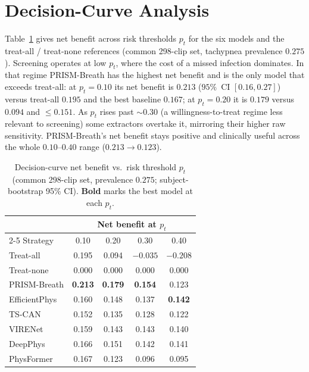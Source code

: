 \section{Decision-Curve Analysis}
\label{app:dca}
Table~\ref{tab:dca} gives net benefit across risk thresholds $p_t$ for the six models and the treat-all /
treat-none references (common 298-clip set, tachypnea prevalence $0.275$). Screening operates at low $p_t$,
where the cost of a missed infection dominates. In that regime PRISM-Breath has the highest net benefit and
is the only model that exceeds treat-all: at $p_t{=}0.10$ its net benefit is $0.213$ ($95\%$~CI
$[0.16,0.27]$) versus treat-all $0.195$ and the best baseline $0.167$; at $p_t{=}0.20$ it is $0.179$ versus
$0.094$ and $\le 0.151$. As $p_t$ rises past $\sim$$0.30$ (a willingness-to-treat regime less relevant to
screening) some extractors overtake it, mirroring their higher raw sensitivity. PRISM-Breath's net benefit
stays positive and clinically useful across the whole $0.10$--$0.40$ range ($0.213 \to 0.123$).

\begin{table}[!t]
\caption{Decision-curve net benefit vs.\ risk threshold $p_t$ (common 298-clip set, prevalence $0.275$;
subject-bootstrap 95\% CI). \textbf{Bold} marks the best model at each $p_t$.}
\label{tab:dca}\centering\small
\begin{tabular}{@{}lcccc@{}}\toprule
 & \multicolumn{4}{c}{Net benefit at $p_t$}\\\cmidrule(l){2-5}
Strategy & 0.10 & 0.20 & 0.30 & 0.40\\\midrule
Treat-all     & 0.195 & 0.094 & $-0.035$ & $-0.208$\\
Treat-none    & 0.000 & 0.000 & 0.000 & 0.000\\\midrule
PRISM-Breath  & \textbf{0.213} & \textbf{0.179} & \textbf{0.154} & 0.123\\
EfficientPhys & 0.160 & 0.148 & 0.137 & \textbf{0.142}\\
TS-CAN        & 0.152 & 0.135 & 0.128 & 0.122\\
VIRENet       & 0.159 & 0.143 & 0.143 & 0.140\\
DeepPhys      & 0.166 & 0.151 & 0.142 & 0.141\\
PhysFormer    & 0.167 & 0.123 & 0.096 & 0.095\\\bottomrule
\end{tabular}
\end{table}

